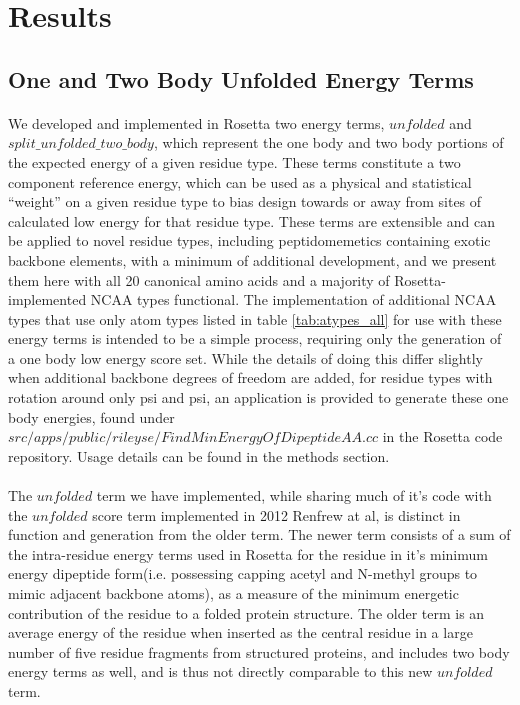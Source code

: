 \section{Results}


\subsection{One and Two Body Unfolded Energy Terms}
\paragraph{}
We developed and implemented in Rosetta two energy terms, $unfolded$ and $split\_unfolded\_two\_body$, which represent the one body and two body portions of the expected energy of a given residue type.
These terms constitute a two component reference energy, which can be used as a physical and statistical ``weight'' on a given residue type to bias design towards or away from sites of calculated low energy for that residue type.
These terms are extensible and can be applied to novel residue types, including peptidomemetics containing exotic backbone elements, with a minimum of additional development, and we present them here with all 20 canonical amino acids and a majority of Rosetta-implemented NCAA types functional.
The implementation of additional NCAA types that use only atom types listed in table \ref{tab:atypes_all} for use with these energy terms is intended to be a simple process, requiring only the generation of a one body low energy score set.
While the details of doing this differ slightly when additional backbone degrees of freedom are added, for residue types with rotation around only psi and psi, an application is provided to generate these one body energies, found under $src/apps/public/rileyse/FindMinEnergyOfDipeptideAA.cc$ in the Rosetta code repository.
Usage details can be found in the methods section.

\paragraph{}
The $unfolded$ term we have implemented, while sharing much of it's code with the $unfolded$ score term implemented in 2012 Renfrew at al\cite{renfrew_incorporation_2012}, is distinct in function and generation from the older term.
The newer term consists of a sum of the intra-residue energy terms used in Rosetta for the residue in it's minimum energy dipeptide form(i.e. possessing capping acetyl and N-methyl groups to mimic adjacent backbone atoms), as a measure of the minimum energetic contribution of the residue to a folded protein structure.
The older term is an average energy of the residue when inserted as the central residue in a large number of five residue fragments from structured proteins, and includes two body energy terms as well, and is thus not directly comparable to this new $unfolded$ term.


